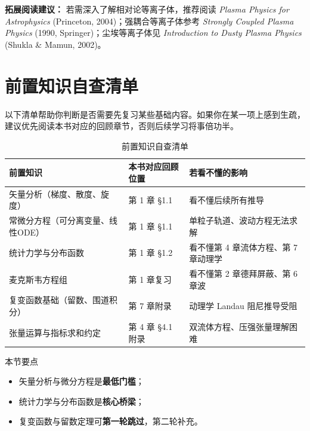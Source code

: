 \begin{tip}
\textbf{拓展阅读建议：}
若需深入了解相对论等离子体，推荐阅读 \textit{Plasma Physics for Astrophysics}
(Princeton, 2004)；强耦合等离子体参考 \textit{Strongly Coupled Plasma Physics}
(1990, Springer)；尘埃等离子体见 \textit{Introduction to Dusty Plasma Physics}
(Shukla \& Mamun, 2002)。
\end{tip}


\section*{前置知识自查清单}

以下清单帮助你判断是否需要先复习某些基础内容。如果你在某一项上感到生疏，
建议优先阅读本书对应的回顾章节，否则后续学习将事倍功半。

\begin{table}[htbp]
\centering
\caption{前置知识自查清单}
\begin{tabular}{@{}llp{5.5cm}@{}}
\toprule
\textbf{前置知识} & \textbf{本书对应回顾位置} & \textbf{若看不懂的影响} \\
\midrule
矢量分析（梯度、散度、旋度） & 第 1 章 \S 1.1 & 看不懂后续所有推导 \\
常微分方程（可分离变量、线性ODE） & 第 1 章 \S 1.1 & 单粒子轨道、波动方程无法求解 \\
统计力学与分布函数 & 第 1 章 \S 1.2 & 看不懂第 4 章流体方程、第 7 章动理学 \\
麦克斯韦方程组 & 第 1 章复习 & 看不懂第 2 章德拜屏蔽、第 6 章波 \\
复变函数基础（留数、围道积分） & 第 7 章附录 & 动理学 Landau 阻尼推导受阻 \\
张量运算与指标求和约定 & 第 4 章 \S 4.1 附录 & 双流体方程、压强张量理解困难 \\
\bottomrule
\end{tabular}
\end{table}

\begin{review}{本节要点}{}
\begin{itemize}
\item 矢量分析与微分方程是\textbf{最低门槛}；
\item 统计力学与分布函数是\textbf{核心桥梁}；
\item 复变函数与留数定理可\textbf{第一轮跳过}，第二轮补充。
\end{itemize}
\end{review}


